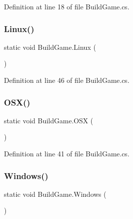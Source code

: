Definition at line 18 of file Build\+Game.\+cs.

\mbox{\label{class_build_game_a15a2ab2ef00e658f9ba55c4a76385a20}} 
\subsubsection{\texorpdfstring{Linux()}{Linux()}}
{\footnotesize\ttfamily static void Build\+Game.\+Linux (\begin{DoxyParamCaption}{ }\end{DoxyParamCaption})\hspace{0.3cm}{\ttfamily [static]}}



Definition at line 46 of file Build\+Game.\+cs.

\mbox{\label{class_build_game_afe7eb06749c1c0bf09cb98d95ef1a4e7}} 
\subsubsection{\texorpdfstring{O\+S\+X()}{OSX()}}
{\footnotesize\ttfamily static void Build\+Game.\+O\+SX (\begin{DoxyParamCaption}{ }\end{DoxyParamCaption})\hspace{0.3cm}{\ttfamily [static]}}



Definition at line 41 of file Build\+Game.\+cs.

\mbox{\label{class_build_game_aed199035998eb614dd0da727347020ab}} 
\subsubsection{\texorpdfstring{Windows()}{Windows()}}
{\footnotesize\ttfamily static void Build\+Game.\+Windows (\begin{DoxyParamCaption}{ }\end{DoxyParamCaption})\hspace{0.3cm}{\ttfamily [static]}}



